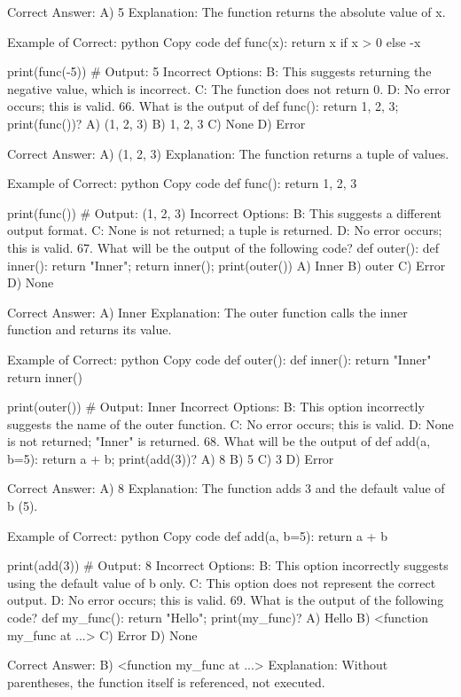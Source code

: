 Correct Answer: A) 5
Explanation: The function returns the absolute value of x.

Example of Correct:
python
Copy code
def func(x):
    return x if x > 0 else -x

print(func(-5))  # Output: 5
Incorrect Options:
B: This suggests returning the negative value, which is incorrect.
C: The function does not return 0.
D: No error occurs; this is valid.
66. What is the output of def func(): return 1, 2, 3; print(func())?
A) (1, 2, 3)
B) 1, 2, 3
C) None
D) Error

Correct Answer: A) (1, 2, 3)
Explanation: The function returns a tuple of values.

Example of Correct:
python
Copy code
def func():
    return 1, 2, 3

print(func())  # Output: (1, 2, 3)
Incorrect Options:
B: This suggests a different output format.
C: None is not returned; a tuple is returned.
D: No error occurs; this is valid.
67. What will be the output of the following code? def outer(): def inner(): return "Inner"; return inner(); print(outer())
A) Inner
B) outer
C) Error
D) None

Correct Answer: A) Inner
Explanation: The outer function calls the inner function and returns its value.

Example of Correct:
python
Copy code
def outer():
    def inner():
        return "Inner"
    return inner()

print(outer())  # Output: Inner
Incorrect Options:
B: This option incorrectly suggests the name of the outer function.
C: No error occurs; this is valid.
D: None is not returned; "Inner" is returned.
68. What will be the output of def add(a, b=5): return a + b; print(add(3))?
A) 8
B) 5
C) 3
D) Error

Correct Answer: A) 8
Explanation: The function adds 3 and the default value of b (5).

Example of Correct:
python
Copy code
def add(a, b=5):
    return a + b

print(add(3))  # Output: 8
Incorrect Options:
B: This option incorrectly suggests using the default value of b only.
C: This option does not represent the correct output.
D: No error occurs; this is valid.
69. What is the output of the following code? def my_func(): return "Hello"; print(my_func)?
A) Hello
B) <function my_func at ...>
C) Error
D) None

Correct Answer: B) <function my_func at ...>
Explanation: Without parentheses, the function itself is referenced, not executed.

